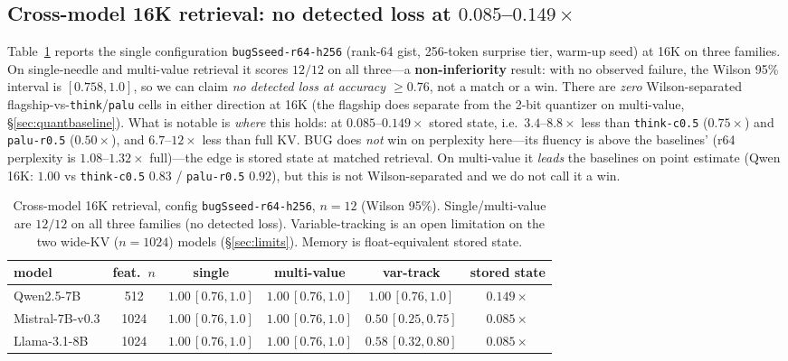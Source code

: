 \documentclass[11pt]{article}
\begin{document}
\subsection{Cross-model 16K retrieval: no detected loss at $0.085$--$0.149\times$}
\label{sec:xmodel}
Table~\ref{tab:xmodel} reports the single configuration
\texttt{bugSseed-r64-h256} (rank-64 gist, 256-token surprise tier, warm-up seed)
at 16K on three families. On single-needle and multi-value retrieval it scores
$12/12$ on all three---a \textbf{non-inferiority} result: with no observed
failure, the Wilson 95\% interval is $[0.758, 1.0]$, so we can claim
\emph{no detected loss at accuracy $\ge0.76$}, not a match or a win. There are
\emph{zero} Wilson-separated flagship-vs-\texttt{think}/\texttt{palu} cells in
either direction at 16K (the flagship does separate from the 2-bit quantizer on
multi-value, \S\ref{sec:quantbaseline}). What is notable is \emph{where} this holds: at $0.085$--$0.149\times$ stored
state, i.e.\ $3.4$--$8.8\times$ less than \texttt{think-c0.5} ($0.75\times$) and
\texttt{palu-r0.5} ($0.50\times$), and $6.7$--$12\times$ less than full KV. BUG
does \emph{not} win on perplexity here---its fluency is above the baselines'
(r64 perplexity is $1.08$--$1.32\times$ full)---the edge is stored state at
matched retrieval. On multi-value it \emph{leads} the baselines on point
estimate (Qwen 16K: $1.00$ vs \texttt{think-c0.5} $0.83$ / \texttt{palu-r0.5}
$0.92$), but this is not Wilson-separated and we do not call it a win.

\begin{table}[t]
\centering
\caption{Cross-model 16K retrieval, config \texttt{bugSseed-r64-h256}, $n{=}12$
(Wilson 95\%). Single/multi-value are $12/12$ on all three families (no detected
loss). Variable-tracking is an open limitation on the two wide-KV ($n{=}1024$)
models (\S\ref{sec:limits}). Memory is float-equivalent stored state.}
\label{tab:xmodel}
\begin{tabular}{lccccc}
\toprule
model & feat.\ $n$ & single & multi-value & var-track & stored state \\
\midrule
Qwen2.5-7B        & 512  & $1.00\,[0.76,1.0]$ & $1.00\,[0.76,1.0]$ & $\mathbf{1.00}\,[0.76,1.0]$ & $0.149\times$ \\
Mistral-7B-v0.3   & 1024 & $1.00\,[0.76,1.0]$ & $1.00\,[0.76,1.0]$ & $0.50\,[0.25,0.75]$          & $0.085\times$ \\
Llama-3.1-8B      & 1024 & $1.00\,[0.76,1.0]$ & $1.00\,[0.76,1.0]$ & $0.58\,[0.32,0.80]$          & $0.085\times$ \\
\bottomrule
\end{tabular}
\end{table}
\end{document}
